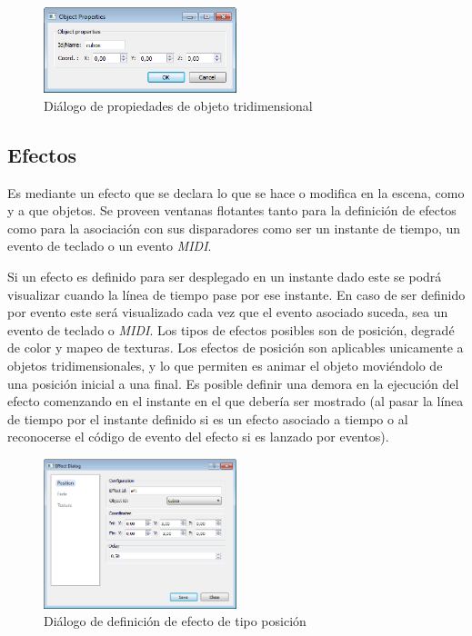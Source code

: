 \begin{figure}[H]
  \centering
    \includegraphics[width=0.5\textwidth]{./Cap5_vmt/vmt_objectProperties.png}
  \caption{Diálogo de propiedades de objeto tridimensional}
  \label{fig:VMT-ObjectProperties}
\end{figure}

\subsection{Efectos}

Es mediante un efecto que se declara lo que se hace o modifica en la escena, como y a que objetos. Se proveen ventanas flotantes tanto para la definición de efectos como para la asociación con sus disparadores como ser un instante de tiempo, un evento de teclado o un evento \emph{MIDI}.

Si un efecto es definido para ser desplegado en un instante dado este se podrá visualizar cuando la línea de tiempo pase por ese instante. En caso de ser definido por evento este será visualizado cada vez que el evento asociado suceda, sea un evento de teclado o \emph{MIDI}.
Los tipos de efectos posibles son de posición, degradé de color y mapeo de texturas.
Los efectos de posición son aplicables unicamente a objetos tridimensionales, y lo que permiten es animar el objeto moviéndolo de una posición inicial a una final. Es posible definir una demora en la ejecución del efecto comenzando en el instante en el que debería ser mostrado (al pasar la línea de tiempo por el instante definido si es un efecto asociado a tiempo o al reconocerse el código de evento del efecto si es lanzado por eventos).

\begin{figure}[H]
  \centering
    \includegraphics[width=0.5\textwidth]{./Cap5_vmt/vmt_EfectDialog1.png}
  \caption{Diálogo de definición de efecto de tipo posición}
  \label{fig:VMT-EffectPossition}
\end{figure}

